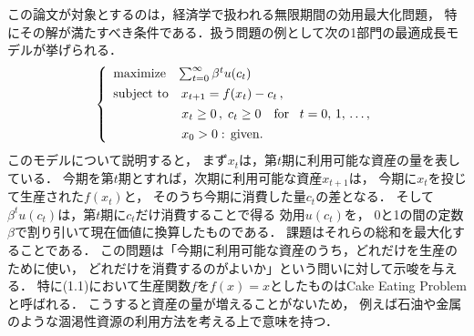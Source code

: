 \documentclass[a4paper,11pt]{jsarticle}
\begin{document}
この論文が対象とするのは，経済学で扱われる無限期間の効用最大化問題，
特にその解が満たすべき条件である．扱う問題の例として次の1部門の最適成長モデルが挙げられる．
\begin{align}
	\left\{
		\begin{array}{l}
			\mathrm{maximize} \hspace{3mm} \sum_{t=0}^\infty \beta^t u(c_t) \vspace{1.4mm}\\
			\mathrm{subject}\hspace{1.2mm}\mathrm{to}\quad x_{t+1}=f(x_t)-c_t\,,\vspace{1.4mm}\\
			\vspace{1.4mm}
			\hspace{18.9mm}x_t \geq 0\,,\;c_t\geq 0 \quad \mathrm{for}\quad\! t=0,\,1,\,\ldots,\\
			\hspace{18.9mm}x_0 > 0 :\, \mathrm{given}.
		\end{array}
        \right.
\end{align}
このモデルについて説明すると，
まず$x_t$は，第$t$期に利用可能な資産の量を表している．
今期を第$t$期とすれば，次期に利用可能な資産$x_{t+1}$は，
今期に$x_t$を投じて生産された$f(x_t)$と，
そのうち今期に消費した量$c_t$の差となる．
そして$\beta^t u(c_t)$は，第$t$期に$c_t$だけ消費することで得る
効用$u(c_t)$を，
0と1の間の定数$\beta$で割り引いて現在価値に換算したものである．
課題はそれらの総和を最大化することである．
この問題は「今期に利用可能な資産のうち，どれだけを生産のために使い，
どれだけを消費するのがよいか」という問いに対して示唆を与える．
特に(1.1)において生産関数$f$を$f(x)=x$としたものはCake Eating Problemと呼ばれる．
こうすると資産の量が増えることがないため，
例えば石油や金属のような涸渇性資源の利用方法を考える上で意味を持つ．
\end{document}
